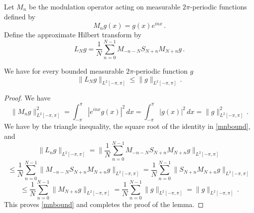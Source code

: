 Let $M_n$ be the modulation operator
acting on measurable $2\pi$-periodic functions
defined by
\begin{equation}
    M_ng(x)=g(x) e^{inx}\, .
\end{equation}
Define the approximate Hilbert transform by
\begin{equation}
    L_N g=\frac 1N\sum_{n=0}^{N-1}
       M_{-n-N} S_{N+n}M_{N+n}g\, .
\end{equation}


\begin{lemma}
\label{modulated-averaged-projection}
We have for every bounded measurable $2\pi$-periodic function $g$
\begin{equation}\label{lnbound}
    \|L_Ng\|_{L^2[-\pi, \pi]}\le \|g\|_{L^2[-\pi, \pi]}\,.
\end{equation}
\end{lemma}
\begin{proof}
    We have
    \begin{equation}\label{mnbound}
        \|M_ng\|_{L^2[-\pi, \pi]}^2=\int_{-\pi}^{\pi} |e^{inx}g(x)|^2\, dx
        =\int_{-\pi}^{\pi} |g(x)|^2\, dx=\|g\|_{L^2[-\pi, \pi]}^2\, .
    \end{equation}
     We have by the triangle inequality, the square root of the identity in \eqref{mnbound}, and 
    \begin{equation*}
        \|L_ng\|_{L^2[-\pi, \pi]}=\|\frac 1N\sum_{n=0}^{N-1}
       M_{-n-N} S_{N+n}M_{N+n}g\|_{L^2[-\pi, \pi]}
    \end{equation*}
    \begin{equation*}
        \le \frac 1N\sum_{n=0}^{N-1} \|
       M_{-n-N} S_{N+n}M_{N+n}g\|_{L^2[-\pi, \pi]}
         = \frac 1N\sum_{n=0}^{N-1} \|
    S_{N+n}M_{N+n}g\|_{L^2[-\pi, \pi]}
    \end{equation*}
       \begin{equation}
     \le \frac 1N\sum_{n=0}^{N-1} \|
 M_{N+n}g\|_{L^2[-\pi, \pi]} = \frac 1N\sum_{n=0}^{N-1} \|
g\|_{L^2[-\pi, \pi]} =\|g\|_{L^2[-\pi, \pi]}\, .
    \end{equation}
This proves \eqref{mnbound} and completes the proof of the lemma.
\end{proof}

